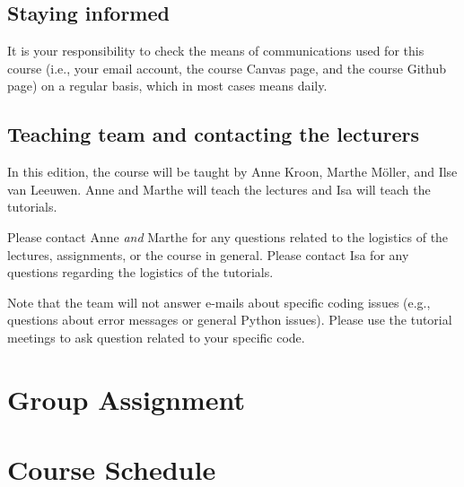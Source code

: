 \documentclass[a4paper,10pt,twocolumn]{report}
\begin{document}
\section{Staying informed}
It is your responsibility to check the means of communications used for this course (i.e., your email account, the course Canvas page, and the course Github page) on a regular basis, which in most cases means daily. 

\section{Teaching team and contacting the lecturers}
In this edition, the course will be taught by Anne Kroon, Marthe Möller, and Ilse van Leeuwen. Anne and Marthe will teach the lectures and Isa will teach the tutorials.

Please contact Anne \emph{and} Marthe for any questions related to the logistics of the lectures, assignments, or the course in general.
Please contact Isa for any questions regarding the logistics of the tutorials. 

Note that the team will not answer e-mails about specific coding issues (e.g., questions about error messages or general Python issues). Please use the tutorial meetings to ask question related to your specific code.

\chapter{Group Assignment}
\label{sec:groupassignment}


\chapter{Course Schedule}





\end{document}
